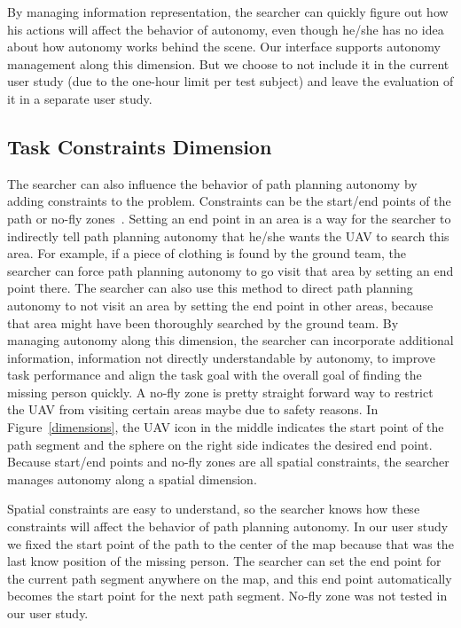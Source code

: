 \documentclass[journal]{IEEEtran}
\begin{document}
By managing information representation, the searcher can quickly figure out how his actions will affect the behavior of autonomy, even though he/she has no idea about how autonomy works behind the scene. Our interface supports autonomy management along this dimension. But we choose to not include it in the current user study (due to the one-hour limit per test subject) and leave the evaluation of it in a separate user study.

\subsection{Task Constraints Dimension}

The searcher can also influence the behavior of path planning autonomy by adding constraints to the problem. Constraints can be the start/end points of the path or no-fly zones~\cite{Clark2013Hierarchical}. Setting an end point in an area is a way for the searcher to indirectly tell path planning autonomy that he/she wants the UAV to search this area. For example, if a piece of clothing is found by the ground team, the searcher can force path planning autonomy to go visit that area by setting an end point there. The searcher can also use this method to direct path planning autonomy to not visit an area by setting the end point in other areas, because that area might have been thoroughly searched by the ground team. By managing autonomy along this dimension, the searcher can incorporate additional information, information not directly understandable by autonomy, to improve task performance and align the task goal with the overall goal of finding the missing person quickly. A no-fly zone is pretty straight forward way to restrict the UAV from visiting certain areas maybe due to safety reasons. In Figure~\ref{dimensions}, the UAV icon in the middle indicates the start point of the path segment and the sphere on the right side indicates the desired end point. Because start/end points and no-fly zones are all spatial constraints, the searcher manages autonomy along a spatial dimension.

Spatial constraints are easy to understand, so the searcher knows how these constraints will affect the behavior of path planning autonomy. In our user study we fixed the start point of the path to the center of the map because that was the last know position of the missing person. The searcher can set the end point for the current path segment anywhere on the map, and this end point automatically becomes the start point for the next path segment. No-fly zone was not tested in our user study.
\end{document}
